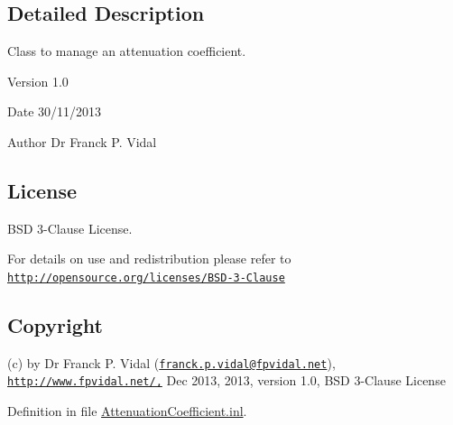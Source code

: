 \subsection{Detailed Description}
Class to manage an attenuation coefficient. \begin{DoxyVersion}{Version}
1.0
\end{DoxyVersion}
\begin{DoxyDate}{Date}
30/11/2013
\end{DoxyDate}
\begin{DoxyAuthor}{Author}
Dr Franck P. Vidal
\end{DoxyAuthor}
\hypertarget{_x_ray_renderer_8inl_License}{}\subsection{License}\label{_x_ray_renderer_8inl_License}
BSD 3-\/Clause License.

For details on use and redistribution please refer to \href{http://opensource.org/licenses/BSD-3-Clause}{\tt http://opensource.org/licenses/BSD-\/3-\/Clause}\hypertarget{_x_ray_renderer_8inl_Copyright}{}\subsection{Copyright}\label{_x_ray_renderer_8inl_Copyright}
(c) by Dr Franck P. Vidal (\href{mailto:franck.p.vidal@fpvidal.net}{\tt franck.p.vidal@fpvidal.net}), \href{http://www.fpvidal.net/,}{\tt http://www.fpvidal.net/,} Dec 2013, 2013, version 1.0, BSD 3-\/Clause License 

Definition in file \hyperlink{_attenuation_coefficient_8inl_source}{AttenuationCoefficient.inl}.

